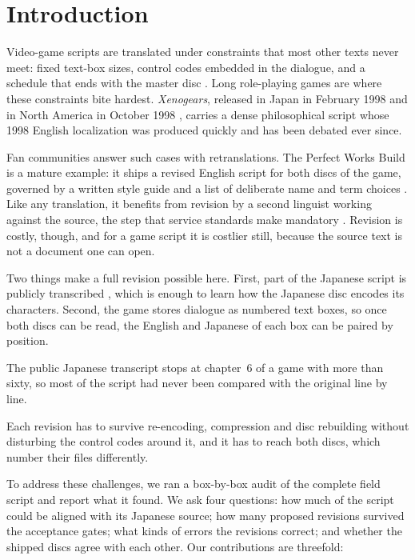 \documentclass[11pt]{article}
\begin{document}
\makepreprinttitle

\section{Introduction}

Video-game scripts are translated under constraints that most other
texts never meet: fixed text-box sizes, control codes embedded in the
dialogue, and a schedule that ends with the master disc
\citep{ohagan2013game}. Long role-playing games are where these
constraints bite hardest. \emph{Xenogears}, released in Japan in February
1998 and in North America in October 1998 \citep{square1998xenogears},
carries a dense philosophical script whose 1998 English localization was
produced quickly and has been debated ever since.

Fan communities answer such cases with retranslations. The Perfect Works
Build \citep{pwbuild} is a mature example: it ships a revised English
script for both discs of the game, governed by a written style guide and
a list of deliberate name and term choices \citep{pwstyle}. Like any
translation, it benefits from revision by a second linguist working
against the source, the step that service standards make mandatory
\citep{iso17100}. Revision is costly, though, and for a game script it is
costlier still, because the source text is not a document one can open.

Two things make a full revision possible here. First, part of the
Japanese script is publicly transcribed \citep{xgus}, which is enough to
learn how the Japanese disc encodes its characters. Second, the game
stores dialogue as numbered text boxes, so once both discs can be read,
the English and Japanese of each box can be paired by position.

 The public Japanese transcript stops at chapter~6 of a game
with more than sixty, so most of the script had never been compared
with the original line by line.

 Each
revision has to survive re-encoding, compression and disc rebuilding
without disturbing the control codes around it, and it has to reach both
discs, which number their files differently.

To address these challenges, we ran a box-by-box audit of the complete
field script and report what it found. We ask four questions: how much
of the script could be aligned with its Japanese source; how many
proposed revisions survived the acceptance gates; what kinds of errors
the revisions correct; and whether the shipped discs agree with each
other. Our contributions are threefold:
\end{document}
